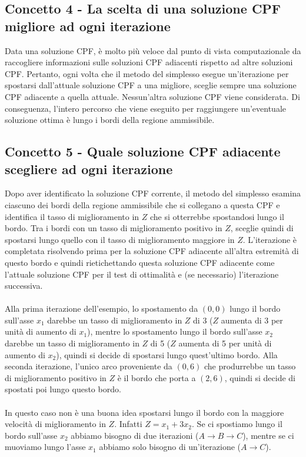 \documentclass[12pt,a4paper]{article}
\begin{document}
\subsection{Concetto 4 - La scelta di una soluzione CPF migliore ad ogni iterazione}
Data una soluzione CPF, è molto più veloce dal punto di vista computazionale da raccogliere informazioni sulle soluzioni CPF adiacenti rispetto ad altre soluzioni CPF. Pertanto, ogni volta che il metodo del simplesso esegue un'iterazione per spostarsi dall'attuale soluzione CPF a una migliore, sceglie sempre una soluzione CPF adiacente a quella attuale. Nessun'altra soluzione CPF viene considerata. Di conseguenza, l'intero percorso che viene eseguito per raggiungere un'eventuale soluzione ottima è lungo i bordi della regione ammissibile.

\subsection{Concetto 5 - Quale soluzione CPF adiacente scegliere ad ogni iterazione}
Dopo aver identificato la soluzione CPF corrente, il metodo del simplesso esamina ciascuno dei bordi della regione ammissibile che si collegano a questa CPF e identifica il tasso di miglioramento in $Z$ che si otterrebbe spostandosi lungo il bordo. Tra i bordi con un tasso di miglioramento positivo in $Z$, sceglie quindi di spostarsi lungo quello con il tasso di miglioramento maggiore in $Z$. L'iterazione è completata risolvendo prima per la soluzione CPF adiacente all'altra estremità di questo bordo e quindi rietichettando questa soluzione CPF adiacente come l'attuale soluzione CPF per il test di ottimalità e (se necessario) l'iterazione successiva.\\
\\
Alla prima iterazione dell'esempio, lo spostamento da $(0, 0)$ lungo il bordo sull'asse $x_1$ darebbe un tasso di miglioramento in $Z$ di 3 ($Z$ aumenta di 3 per unità di aumento di $x_1$), mentre lo spostamento lungo il bordo sull'asse $x_2$ darebbe un tasso di miglioramento in $Z$ di 5 ($Z$ aumenta di 5 per unità di aumento di $x_2$), quindi si decide di spostarsi lungo quest'ultimo bordo. Alla seconda iterazione, l'unico arco proveniente da $(0, 6)$ che produrrebbe un tasso di miglioramento positivo in $Z$ è il bordo che porta a $(2, 6)$, quindi si decide di spostati poi lungo questo bordo.\\\\
In questo caso non è una buona idea spostarsi lungo il bordo con la maggiore velocità di miglioramento in $Z$. Infatti $Z = x_1 + 3x_2$. Se ci spostiamo lungo il bordo sull'asse $x_2$ abbiamo bisogno di due iterazioni ($A\rightarrow B \rightarrow C$), mentre se ci muoviamo lungo l'asse $x_1$ abbiamo solo bisogno di un'iterazione ($A \rightarrow C$).
\end{document}
